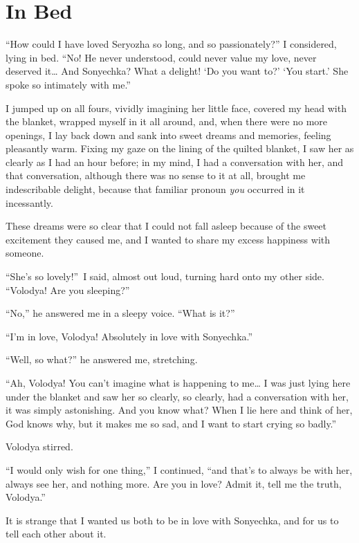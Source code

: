 \chapter{In Bed} %

``How could I have loved Seryozha so long, and so passionately?'' I considered, lying in bed. ``No! He never understood, could never value my love, never deserved it\ldots{} And Sonyechka? What a delight! `Do you want to?' `You start.' She spoke so intimately with me.'' %

I jumped up on all fours, vividly imagining her little face, covered my head with the blanket, wrapped myself in it all around, and, when there were no more openings, I lay back down and sank into sweet dreams and memories, feeling pleasantly warm. Fixing my gaze on the lining of the quilted blanket, I saw her as clearly as I had an hour before; in my mind, I had a conversation with her, and that conversation, although there was no sense to it at all, brought me indescribable delight, because that familiar pronoun \textit{you} occurred in it incessantly.

These dreams were so clear that I could not fall asleep because of the sweet excitement they caused me, and I wanted to share my excess happiness with someone. 

``She's so lovely!''~I said, almost out loud, turning hard onto my other side. ``Volodya! Are you sleeping?'' %

``No,'' he answered me in a sleepy voice. ``What is it?'' %

``I'm in love, Volodya! Absolutely in love with Sonyechka.'' %

``Well, so what?'' he answered me, stretching.

``Ah, Volodya! You can't imagine what is happening to me\ldots{} I was just lying here under the blanket and saw her so clearly, so clearly, had a conversation with her, it was simply astonishing. And you know what? When I lie here and think of her, God knows why, but it makes me so sad, and I want to start crying so badly.'' %

Volodya stirred.

``I would only wish for one thing,'' I continued, ``and that's to always be with her, always see her, and nothing more. Are you in love? Admit it, tell me the truth, Volodya.'' %

It is strange that I wanted us both to be in love with Sonyechka, and for us to tell each other about it.

